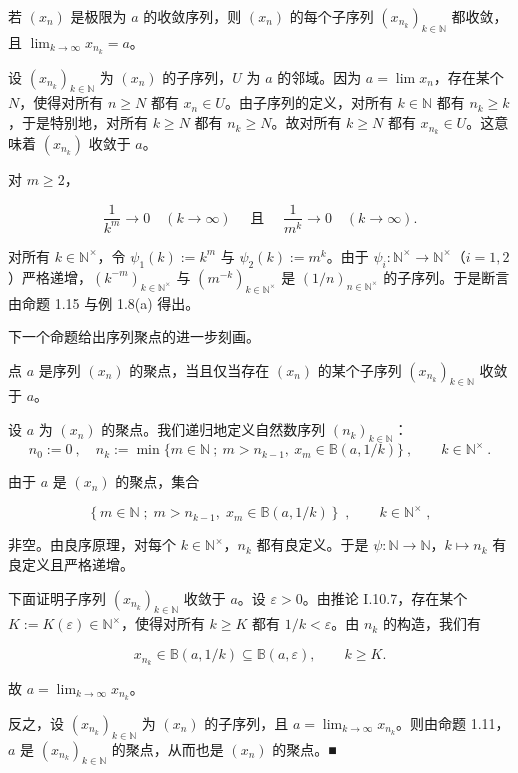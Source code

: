 \begin{proposition}

若  $ (x_n) $ 是极限为  $ a $ 的收敛序列，则  $ (x_n) $ 的每个子序列  $ (x_{n_k})_{k \in \mathbb{N}} $ 都收敛，且  $ \lim_{k \to \infty} x_{n_k} = a $。

\proofhead
设  $ (x_{n_k})_{k \in \mathbb{N}} $ 为  $ (x_n) $ 的子序列，$ U $ 为  $ a $ 的邻域。因为  $ a = \lim x_n $，存在某个  $ N $，使得对所有  $ n \geq N $ 都有  $ x_n \in U $。由子序列的定义，对所有  $ k \in \mathbb{N} $ 都有  $ n_k \geq k $，于是特别地，对所有  $ k \geq N $ 都有  $ n_k \geq N $。故对所有  $ k \geq N $ 都有  $ x_{n_k} \in U $。这意味着  $ (x_{n_k}) $ 收敛于  $ a $。
\end{proposition}

\begin{example}

对  $ m \geq 2 $，

\[
\frac{1}{k^{m}}\to0\quad(k\to\infty)\quad\text{ 且 }\quad\frac{1}{m^{k}}\to0\quad(k\to\infty).
\]

\proofhead
对所有 $k \in \mathbb{N}^\times$，令 $\psi_1(k) := k^m$ 与 $\psi_2(k) := m^k$。由于 $\psi_i: \mathbb{N}^\times \to \mathbb{N}^\times$（$i=1,2$）严格递增，$(k^{-m})_{k\in\mathbb{N}^\times}$ 与 $(m^{-k})_{k\in\mathbb{N}^\times}$ 是 $(1/n)_{n\in\mathbb{N}^\times}$ 的子序列。于是断言由命题 1.15 与例 1.8(a) 得出。

下一个命题给出序列聚点的进一步刻画。
\end{example}

\begin{proposition}

点 $a$ 是序列 $(x_n)$ 的聚点，当且仅当存在 $(x_n)$ 的某个子序列 $(x_{n_k})_{k \in \mathbb{N}}$ 收敛于 $a$。

\proofhead
设 $a$ 为 $(x_n)$ 的聚点。我们递归地定义自然数序列 $(n_k)_{k \in \mathbb{N}}$：
\[
n_{0}:=0~,\quad n_{k}:=\operatorname*{m i n}\bigl\{m\in\mathbb{N}~;~m>n_{k-1},~x_{m}\in\mathbb{B}(a,1/k)\bigr\}~,\qquad k\in\mathbb{N}^{\times}~.
\]

由于 $a$ 是 $(x_{n})$ 的聚点，集合

\[
\left\{m\in\mathbb{N}\;;\;m>n_{k-1},\;x_{m}\in\mathbb{B}(a,1/k)\right\}\;,\qquad k\in\mathbb{N}^{\times}\;,
\]

非空。由良序原理，对每个  $ k \in \mathbb{N}^\times $，$ n_k $ 都有良定义。于是  $ \psi: \mathbb{N} \to \mathbb{N} $，$ k \mapsto n_k $ 有良定义且严格递增。

下面证明子序列 $(x_{n_k})_{k \in \mathbb{N}}$ 收敛于 $a$。设 $\varepsilon > 0$。由推论 I.10.7，存在某个 $K := K(\varepsilon) \in \mathbb{N}^\times$，使得对所有 $k \geq K$ 都有 $1/k < \varepsilon$。由 $n_k$ 的构造，我们有

\[
x_{n_{k}}\in\mathbb{B}(a,1/k)\subseteq\mathbb{B}(a,\varepsilon),\qquad k\geq K.
\]

故  $ a = \lim_{k \to \infty} x_{n_k} $。

反之，设  $ (x_{n_k})_{k \in \mathbb{N}} $ 为  $ (x_n) $ 的子序列，且  $ a = \lim_{k \to \infty} x_{n_k} $。则由命题 1.11，$ a $ 是  $ (x_{n_k})_{k \in \mathbb{N}} $ 的聚点，从而也是  $ (x_n) $ 的聚点。■

\end{proposition}

